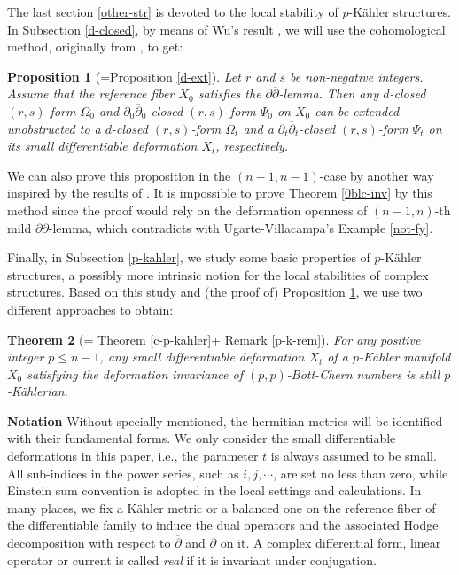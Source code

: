 \documentclass[12pt]{amsart}
\numberwithin{equation}{section}
\newtheorem{theorem} {Theorem} [section]
\newtheorem{proposition}[theorem]{Proposition}
\renewcommand{\1}{\mathds{1}}
\newcommand{\db}{\overline{\partial}}
\renewcommand{\>}{\rightarrow}
\newcommand{\p}{\partial}
\def\p{\partial}
\begin{document}
The last section \ref{other-str} is devoted to the local stability of $p$-K\"ahler structures.
In Subsection \ref{d-closed}, by means of Wu's result \cite[Theorem 5.13]{w}, we
will use the cohomological method, originally from \cite{KS}, to
get:
\begin{proposition}[=Proposition \ref{d-ext}]\label{0d-ext}
Let $r$ and $s$ be non-negative integers. Assume that the reference
fiber $X_0$ satisfies the $\p\db$-lemma. Then any $d$-closed
$(r,s)$-form $\Omega_0$ and $\p_0\db_0$-closed $(r,s)$-form $\Psi_0$
on $X_0$ can be extended unobstructed to a $d$-closed $(r,s)$-form
$\Omega_t$ and a $\p_t\db_t$-closed $(r,s)$-form $\Psi_t$ on its
small differentiable deformation $X_t$, respectively.
\end{proposition}
We can also prove this proposition in the $(n-1,n-1)$-case by another way inspired by the
results of \cite{au,FY,w}. It is impossible to prove Theorem \ref{0blc-inv}
by this method since the proof would rely on the deformation
openness of $(n-1,n)$-th mild $\p\db$-lemma, which contradicts with
Ugarte-Villacampa's Example \ref{not-fy}.


Finally, in Subsection \ref{p-kahler}, we study some basic
properties of $p$-K\"ahler structures, a possibly more intrinsic
notion for the local stabilities of complex structures. Based on
this study and (the proof of) Proposition \ref{0d-ext}, we use two different approaches to obtain:
\begin{theorem}[= Theorem \ref{c-p-kahler}+ Remark \ref{p-k-rem}]
For any positive integer $p\leq n-1$, any
small differentiable deformation $X_t$ of a
$p$-K\"ahler manifold $X_0$ satisfying the deformation invariance of $(p,p)$-Bott-Chern numbers is still
$p$-K\"ahlerian.
\end{theorem}


\noindent \textbf{Notation} Without specially mentioned, the
hermitian metrics will be identified with their fundamental forms.
We only consider the
small differentiable deformations in this paper, i.e.,
the parameter $t$ is always assumed to be small. All sub-indices in
the power series, such as $i,j,\cdots$, are set no less than zero,
while Einstein sum convention is adopted in the local settings and
calculations. In many places, we fix a K\"ahler metric or a balanced
one on the reference fiber of the differentiable family to induce the
dual operators and the associated Hodge decomposition with respect
to $\db$ and $\p$ on it. A complex differential form, linear
operator or current is called \emph{real} if it is invariant under conjugation.
\end{document}
